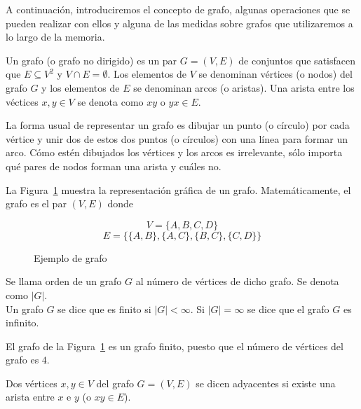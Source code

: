 A continuación, introduciremos el concepto de grafo, algunas operaciones que se pueden realizar con ellos y alguna de las medidas sobre grafos que utilizaremos a lo largo de la memoria.\\

\begin{defi}
	Un grafo (o grafo no dirigido) es un par $G = (V,E)$ de conjuntos que satisfacen que $E \subseteq V^2$ y $V \cap E = \emptyset$. Los elementos de $V$ se denominan vértices (o nodos) del grafo $G$ y los elementos de $E$ se denominan arcos (o aristas). Una arista entre los véctices $x, y \in V$ se denota como $xy$ o $yx \in E$.
\end{defi}

La forma usual de representar un grafo es dibujar un punto (o círculo) por cada vértice y unir dos de estos dos puntos (o círculos) con una línea para formar un arco. Cómo estén dibujados los vértices y los arcos es irrelevante, sólo importa qué pares de nodos forman una arista y cuáles no.

\begin{ejemplo}
	
	La Figura~\ref{fig:grafo} muestra la representación gráfica de un grafo. Matemáticamente, el grafo es el par $(V, E)$ donde
	
	\[ V = \{A, B, C, D\} \]
	\[ E = \{\{A,B\},\{A,C\},\{B,C\},\{C,D\} \} \]
	
	\begin{figure}[htb]
		\centering
		\ejemplografo
		\caption{Ejemplo de grafo}
		\label{fig:grafo}
	\end{figure}
	
\end{ejemplo}

\begin{defi}
	Se llama orden de un grafo $G$ al número de vértices de dicho grafo. Se denota como $|G|$.\\
	Un grafo $G$ se dice que es finito si $|G| < \infty$. Si $|G| = \infty$ se dice que el grafo $G$ es infinito.
\end{defi}

\begin{ejemplo}
	El grafo de la Figura~\ref{fig:grafo} es un grafo finito, puesto que el número de vértices del grafo es $4$.
\end{ejemplo}

\begin{defi}
	Dos vértices $x,y \in V$ del grafo $G = (V,E)$ se dicen adyacentes si existe una arista entre $x$ e $y$ (o $xy \in E$).
\end{defi}

